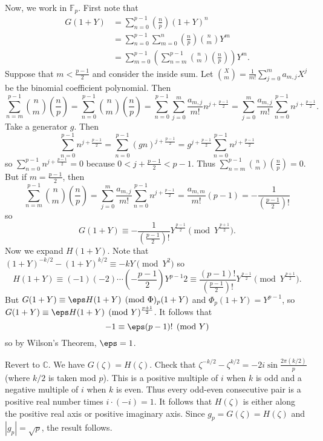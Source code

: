 Now, we work in $\mathbb{F}_p$. First note that
\begin{align*}
	G(1+Y) &= \sum_{n=0}^{p-1}\left(\frac{n}{p}\right)(1+Y)^n \\
	&= \sum_{n=0}^{p-1}\sum_{m=0}^n\left(\frac{n}{p}\right)\binom{n}{m}Y^m \\
	&= \sum_{m=0}^{p-1}\left(\sum_{n=m}^{p-1}\binom{n}{m}\left(\frac{n}{p}\right)\right)Y^m.
\end{align*}
Suppose that $m<\frac{p-1}{2}$ and consider the inside sum. Let $\binom{X}{m}=\frac{1}{m!}\displaystyle\sum_{j=0}^ma_{m,j}X^j$ be the binomial coefficient polynomial. Then
\[
	\sum_{n=m}^{p-1}\binom{n}{m}\left(\frac{n}{p}\right)=\sum_{n=0}^{p-1}\binom{n}{m}\left(\frac{n}{p}\right)=\sum_{n=0}^{p-1}\sum_{j=0}^m\frac{a_{m,j}}{m!}n^{j+\frac{p-1}{2}}=\sum_{j=0}^m\frac{a_{m,j}}{m!}\sum_{n=0}^{p-1}n^{j+\frac{p-1}{2}}.
\]
Take a generator $g$. Then
\[
	\sum_{n=0}^{p-1}n^{j+\frac{p-1}{2}}=\sum_{n=0}^{p-1}(gn)^{j+\frac{p-1}{2}}=g^{j+\frac{p-1}{2}}\sum_{n=0}^{p-1}n^{j+\frac{p-1}{2}}
\]
so $\displaystyle\sum_{n=0}^{p-1}n^{j+\frac{p-1}{2}}=0$ because $0<j+\frac{p-1}{2}<p-1$. Thus $\displaystyle\sum_{n=m}^{p-1}\binom{n}{m}\left(\frac{n}{p}\right)=0$. But if $m=\frac{p-1}{2}$, then
\[
	\sum_{n=m}^{p-1}\binom{n}{m}\left(\frac{n}{p}\right)=\sum_{j=0}^m\frac{a_{m,j}}{m!}\sum_{n=0}^{p-1}n^{j+\frac{p-1}{2}}=\frac{a_{m,m}}{m!}(p-1)=-\frac{1}{\left(\frac{p-1}{2}\right)!}
\]
so
\[
	G(1+Y)\equiv-\frac{1}{\left(\frac{p-1}{2}\right)!}Y^{\frac{p-1}{2}}\pmod{Y^{\frac{p+1}{2}}}.
\]
Now we expand $H(1+Y)$. Note that $(1+Y)^{-k/2}-(1+Y)^{k/2}\equiv-kY\pmod{Y^2}$ so
\[
	H(1+Y)\equiv(-1)(-2)\cdots\left(-\frac{p-1}{2}\right)Y^{p-1}{2}\equiv\frac{(p-1)!}{\left(\frac{p-1}{2}\right)!}Y^{\frac{p-1}{2}}\pmod{Y^{\frac{p+1}{2}}}.
\]
But $G(1+Y)\equiv\eps H(1+Y)\pmod\Phi_p(1+Y)$ and $\Phi_p(1+Y)=Y^{p-1}$, so $G(1+Y)\equiv\eps H(1+Y)\pmod Y^{\frac{p+1}{2}}$. It follows that
\[
	-1\equiv\eps(p-1)!\pmod Y
\]
so by Wilson's Theorem, $\eps=1$.

Revert to $\mathbb{C}$. We have $G(\zeta)=H(\zeta)$. Check that $\zeta^{-k/2}-\zeta^{k/2}=-2i\sin\frac{2\pi(k/2)}{p}$ (where $k/2$ is taken mod $p$). This is a positive multiple of $i$ when $k$ is odd and a negative multiple of $i$ when $k$ is even. Thus every odd-even consecutive pair is a positive real number times $i\cdot(-i)=1$. It follows that $H(\zeta)$ is either along the positive real axis or positive imaginary axis. Since $g_p=G(\zeta)=H(\zeta)$ and $|g_p|=\sqrt{p}$, the result follows.